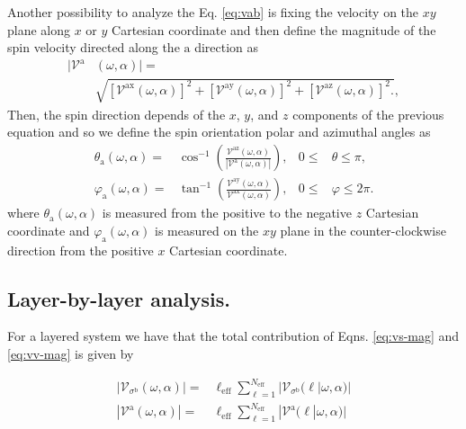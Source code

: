 \documentclass[prb,11pt,tightenlines,twocolumn,aps]{revtex4-1}
\begin{document}
{\color{red} Another possibility to analyze the Eq. \eqref{eq:vab} is fixing the velocity on
the $xy$ plane along $x$ or $y$ Cartesian coordinate and then define the
magnitude of the spin velocity directed along the $\mathrm{a}$ direction as}
\begin{align}
|\mathcal{V}^{\mathrm{a}}&(\omega,\alpha)| = \nonumber \\
&\sqrt { 
[\mathcal{V}^{\mathrm{ax}}(\omega,\alpha)]^{2} +
[\mathcal{V}^{\mathrm{ay}}(\omega,\alpha)]^{2} +
[\mathcal{V}^{\mathrm{az}}(\omega,\alpha)]^{2} .
},
\label{eq:vv-mag}
\end{align}
{\color{red} Then, the spin direction depends of the $x$, $y$, and $z$
components of the previous equation and so we define the spin orientation polar
and azimuthal angles as}
\begin{align}
\theta_{\mathrm{a}}  (\omega,\alpha)
=& 
\cos^{-1} \left( \frac{\mathcal{V}^{\mathrm{az}}(\omega,\alpha)}
{|\mathcal{V}^{\mathrm{a}}(\omega,\alpha)|} \right),
& 0 \leq &\theta \leq \pi, 
\label{eq:polar-ang}
\\
\varphi_{\mathrm{a}} (\omega,\alpha)
=& 
\tan^{-1} \left( \frac{\mathcal{V}^{\mathrm{ay}}(\omega,\alpha)}
{\mathcal{V}^{\mathrm{ax}}(\omega,\alpha)} \right),
& 0 \leq &\varphi \leq 2\pi.
\label{eq:azimuthal-ang} 
\end{align}
{\color{red} where $\theta_{\mathrm{a}}(\omega,\alpha)$ is measured from the
positive to the negative $z$ Cartesian coordinate and
$\varphi_{\mathrm{a}}(\omega,\alpha)$ is measured on the $xy$ plane in the
counter-clockwise direction from the positive $x$ Cartesian coordinate.}




\subsection{Layer-by-layer analysis.}\label{sec:theory-layer}

For a layered system we have that the total contribution of Eqns. 
\eqref{eq:vs-mag} and \eqref{eq:vv-mag} is given \cite{arzatePRB14} by 

\begin{align}
|\mathcal{V}_{\sigma^{\mathrm{b}}}(\omega,\alpha)|
=& 
\ell_{\mathrm{eff}}
\sum_{\ell=1}^{N_{\mathrm{eff}}}
|\mathcal{V}_{\sigma^{\mathrm{b}}} (\ell | \omega,\alpha)|
\label{eq:vs-layer}
\\
|\mathcal{V}^{\mathrm{a}}(\omega,\alpha)|
=&
\ell_{\mathrm{eff}}
\sum_{\ell=1}^{N_{\mathrm{eff}}}
|\mathcal{V}^{\mathrm{a}} (\ell | \omega,\alpha)|
\label{eq:vv-layer}
\end{align}
\end{document}
